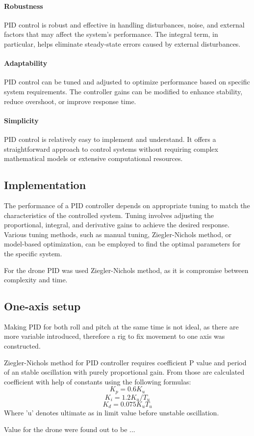 \paragraph{Robustness}PID control is robust and effective in handling disturbances, noise, and external factors that may affect the system's performance. The integral term, in particular, helps eliminate steady-state errors caused by external disturbances.
\paragraph{Adaptability}PID control can be tuned and adjusted to optimize performance based on specific system requirements. The controller gains can be modified to enhance stability, reduce overshoot, or improve response time.
\paragraph{Simplicity}PID control is relatively easy to implement and understand. It offers a straightforward approach to control systems without requiring complex mathematical models or extensive computational resources.

\subsection{Implementation}
The performance of a PID controller depends on appropriate tuning to match the characteristics of the controlled system. Tuning involves adjusting the proportional, integral, and derivative gains to achieve the desired response. Various tuning methods, such as manual tuning, Ziegler-Nichols method, or model-based optimization, can be employed to find the optimal parameters for the specific system.

For the drone PID was used Ziegler-Nichols method, as it is compromise between complexity and time.

\subsection{One-axis setup}
Making PID for both roll and pitch at the same time is not ideal, as there are more variable introduced, therefore a rig to fix movement to one axis was constructed. 

Ziegler-Nichols method for PID controller requires coefficient P value and period of an stable oscillation with purely proportional gain. From those are calculated coefficient with help of constants using the following formulas: $$K_p = 0.6K_u$$ $$K_i = 1.2K_u / T_u$$ $$K_d = 0.075K_uT_u$$ Where 'u' denotes ultimate as in limit value before unstable oscillation.

Value for the drone were found out to be ...


